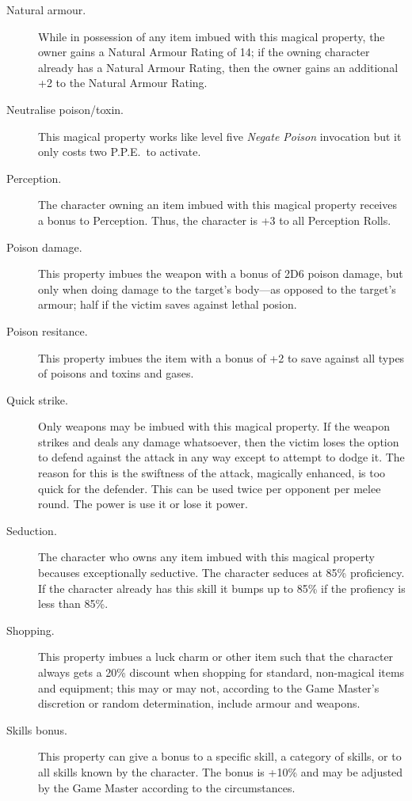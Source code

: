 \begin{description}
\item[Natural armour.]
While in possession of any item
imbued with this magical property,
the owner gains a Natural Armour
Rating of 14;
if the owning character already has
a Natural Armour Rating, then the
owner gains an additional +2 to the
Natural Armour Rating.

\item[Neutralise poison/toxin.]
This magical property works like
level five \emph{Negate Poison}
invocation but it only costs two P.P.E.\ to activate.

\item[Perception.]
The character owning an item imbued
with this magical property receives a
bonus to Perception.
Thus, the character is +3 to all
Perception Rolls.

\item[Poison damage.] This property imbues the weapon with a bonus of 2D6 poison damage,
but only when doing damage to the target's body---as opposed to the target's armour;
half if the victim saves against lethal posion.

\item[Poison resitance.] This property imbues the item with a bonus of +2 to save against
all types of poisons and toxins and gases.

\item[Quick strike.]
Only weapons may be imbued with
this magical property.
If the weapon strikes and deals any damage whatsoever,
then the victim loses the option to defend against the attack
in any way except to attempt to dodge it.
The reason for this is the swiftness of the attack,
magically enhanced,
is too quick for the defender.
This can be used twice per opponent per melee round.
The power is use it or lose it power.

\item[Seduction.] The character who
owns any item imbued with this magical
property becauses exceptionally
seductive.
The character seduces at 85\%
proficiency.
If the character already has this skill
it bumps up to 85\% if the profiency is
less than 85\%.

\item[Shopping.] This property imbues a luck charm or other item such that
the character always gets a 20\% discount when shopping for standard, non-magical items
and equipment; this may or may not, according to the Game Master's discretion or random
determination, include armour and weapons.

\item[Skills bonus.] This property can give a bonus to a specific skill,
a category of skills, or to all skills known by the character.
The bonus is +10\% and may be adjusted by the Game Master according to the
circumstances.


\end{description}
